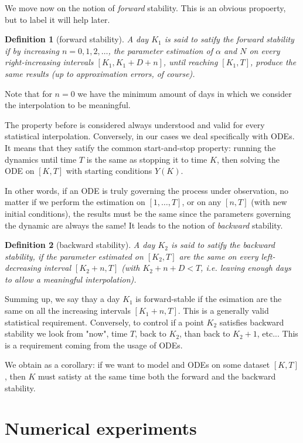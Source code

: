 \documentclass[6pt]{article}
\newtheorem{deff}{Definition}
\begin{document}
We move now on the notion of \emph{forward} stability.
This is an obvious propoerty, but to label it will help later.

\begin{deff}[forward stability]
A day $K_1$ is said to satify the forward stability if 
by increasing $n = 0, 1, 2, \dots$, the parameter estimation of $\alpha$ 
and $N$ on every right-increasing intervals $[K_1, K_1 + D + n]$, 
until reaching $[K_1, T]$, produce the same results 
(up to approximation errors, of course).
\end{deff}

Note that for $n = 0$ we have the minimum amount of days in which we 
consider the interpolation to be meaningful.

The property before is considered always understood
and valid for every statistical interpolation. Conversely,
in our cases we deal specifically with ODEs. It means that they
satify the common start-and-stop property: running the dynamics
until time $T$ is the same as stopping it to time $K$, then
solving the ODE on $[K, T]$ with starting conditions $Y(K)$.

In other words, if an ODE is truly governing the process under observation,
no matter if we perform the estimation on $[1,\dots,T]$, or on any
$[n, T]$ (with new initial conditions),
the results must be the same since the parameters governing the
dynamic are always the same!
It leads to the notion of \emph{backward} stability.

\begin{deff}[backward stability]
A day $K_2$ is said to satify the backward stability, if
the parameter estimated on $[K_2, T]$ are the same on every
left-decreasing interval $[K_2 + n, T]$ 
(with $K_2 + n + D < T$, i.e. leaving enough days to allow a meaningful interpolation).
\end{deff}

Summing up, we say thay a day $K_1$ is forward-stable if the esimation
are the same on all the increasing intervals $[K_1 +n, T]$.
This is a generally valid statistical requirement.
Conversely, to control if a point $K_2$ satisfies backward stability we 
look from "now", time $T$, back to $K_2$, than back to $K_2 + 1$, etc...
This is a requirement coming from the usage of ODEs.

We obtain as a corollary:
if we want to model and ODEs on some dataset $[K, T]$, then $K$ must
satisty at the same time both the forward and the backward stability.


\section{Numerical experiments}
\end{document}
